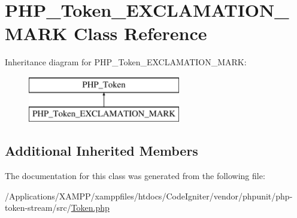 \hypertarget{class_p_h_p___token___e_x_c_l_a_m_a_t_i_o_n___m_a_r_k}{}\section{P\+H\+P\+\_\+\+Token\+\_\+\+E\+X\+C\+L\+A\+M\+A\+T\+I\+O\+N\+\_\+\+M\+A\+RK Class Reference}
\label{class_p_h_p___token___e_x_c_l_a_m_a_t_i_o_n___m_a_r_k}
Inheritance diagram for P\+H\+P\+\_\+\+Token\+\_\+\+E\+X\+C\+L\+A\+M\+A\+T\+I\+O\+N\+\_\+\+M\+A\+RK\+:\begin{figure}[H]
\begin{center}
\leavevmode
\includegraphics[height=2.000000cm]{class_p_h_p___token___e_x_c_l_a_m_a_t_i_o_n___m_a_r_k}
\end{center}
\end{figure}
\subsection*{Additional Inherited Members}


The documentation for this class was generated from the following file\+:\begin{DoxyCompactItemize}
\item 
/\+Applications/\+X\+A\+M\+P\+P/xamppfiles/htdocs/\+Code\+Igniter/vendor/phpunit/php-\/token-\/stream/src/\mbox{\hyperlink{_token_8php}{Token.\+php}}\end{DoxyCompactItemize}
